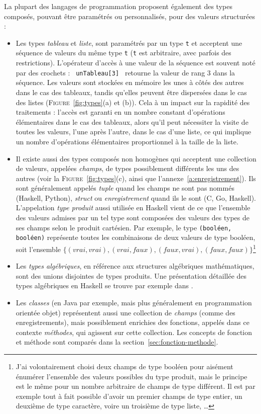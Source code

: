\documentclass[a4paper,francais]{insalyon}
\begin{document}
La plupart des langages de programmation proposent également des types composés, pouvant être paramétrés ou personnalisés, pour des valeurs structurées :
\begin{itemize}
\item Les types \emph{tableau} et \emph{liste}, sont paramétrés par un type \texttt{t} et acceptent une séquence de valeurs du même type \texttt{t} (\texttt{t} est arbitraire, avec parfois des restrictions). L'opérateur d'accès à une valeur de la séquence est souvent noté par des crochets : \verb! unTableau[3] ! retourne la valeur de rang 3 dans la séquence. Les valeurs sont stockées en mémoire les unes à côtés des autres dans le cas des tableaux, tandis qu'elles peuvent être dispersées dans le cas des listes (\textsc{Figure}~\ref{fig:types}(a) et (b)). Cela à un impact sur la rapidité des traitements : l'accès est garanti en un nombre constant d'opérations élémentaires dans le cas des tableaux, alors qu'il peut nécessiter la visite de toutes les valeurs, l'une après l'autre, dans le cas d'une liste, ce qui implique un nombre d'opérations élémentaires proportionnel à la taille de la liste.
\item Il existe aussi des types composés non homogènes qui acceptent une collection de valeurs, appelées \emph{champs}, de types possiblement différents les uns des autres (voir la \textsc{Figure}~\ref{fig:types}(c), ainsi que l'annexe~\ref{a:enregistrement}). Ils sont généralement appelés \emph{tuple} quand les champs ne sont pas nommés (Haskell, Python), \emph{struct} ou \emph{enregistrement} quand ils le sont (C, Go, Haskell). L'appelation \emph{type produit} aussi utilisée en Haskell vient de ce que l'ensemble des valeurs admises par un tel type sont composées des valeurs des types de ses champs selon le produit cartésien. Par exemple, le type \verb!(booléen, booléen)! représente toutes les combinaisons de deux valeurs de type booléen, soit l'ensemble $\{ (vrai, vrai), (vrai, faux), (faux, vrai), (faux, faux) \}$\footnote{J'ai volontairement choisi deux champs de type booléen pour aisément énumérer l'ensemble des valeurs possibles du type produit, mais le principe est le même pour un nombre arbitraire de champs de type différent. Il est par exemple tout à fait possible d'avoir un premier champs de type entier, un deuxième de type caractère, voire un troisième de type liste, \ldots}   
\item Les \emph{types algébriques}, en référence aux structures algébriques mathématiques, sont des unions disjointes de types produits. Une présentation détaillée des types algébriques en Haskell se trouve par exemple dans \cite[chapitre 3]{haskell}.    
\item Les \emph{classes} (en Java par exemple, mais plus généralement en programmation orientée objet) représentent aussi une collection de \emph{champs} (comme des enregistrements), mais possiblement enrichies des fonctions, appelés dans ce contexte \emph{méthodes}, qui agissent sur cette collection. Les concepts de fonction et méthode sont comparés dans la section~\ref{sec:fonction-methode}.
\end{itemize}
\end{document}
